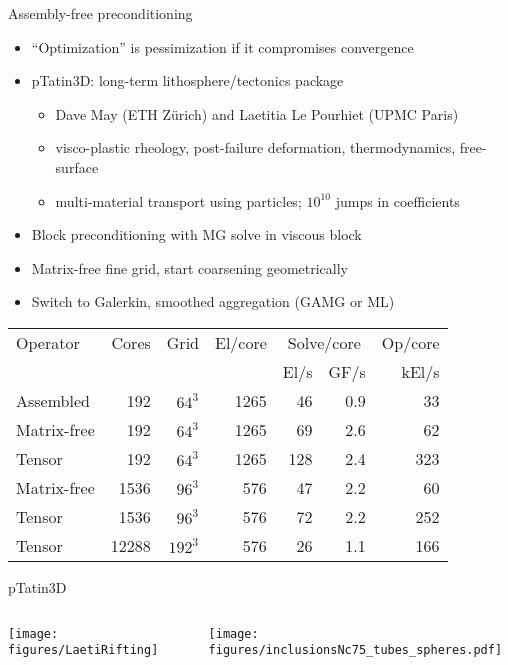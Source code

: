 \documentclass{beamer}
\begin{document}
\begin{frame}{Assembly-free preconditioning}
  \begin{itemize}
  \item ``Optimization'' is pessimization if it compromises convergence
  \item pTatin3D: long-term lithosphere/tectonics package
    \begin{itemize}
    \item Dave May (ETH Z\"urich) and Laetitia Le Pourhiet (UPMC Paris)
    \item visco-plastic rheology, post-failure deformation, thermodynamics, free-surface
    \item multi-material transport using particles; $10^{10}$ jumps in coefficients
    \end{itemize}
  \item Block preconditioning with MG solve in viscous block
  \item Matrix-free fine grid, start coarsening geometrically
  \item Switch to Galerkin, smoothed aggregation (GAMG or ML)
  \end{itemize}
  \begin{tabular}{l rrr rr r}
    \toprule
    Operator    & Cores & Grid   & El/core & \multicolumn{2}{c}{Solve/core} & Op/core           \\
    &       &        &         & El/s                    & GF/s & kEl/s \\
    \midrule
    Assembled   & 192 & $64^3$ & 1265 & 46  & 0.9 & 33         \\
    Matrix-free & 192 & $64^3$ & 1265 & 69  & 2.6 & 62         \\
    Tensor      & 192 & $64^3$ & 1265 & 128 & 2.4 & 323        \\
    
    Matrix-free & 1536 & $96^3$ & 576  & 47  & 2.2 & 60  \\
    Tensor      & 1536 & $96^3$ & 576  & 72  & 2.2 & 252 \\
    
    Tensor      & 12288 & $192^3$ & 576  & 26 & 1.1 & 166 \\
    \bottomrule
  \end{tabular}
\end{frame}

\begin{frame}{pTatin3D}
  \begin{columns}
    \begin{column}{0.5\textwidth}
      \begin{center}
        \texttt{[image: figures/LaetiRifting]}
      \end{center}
    \end{column}
    \begin{column}{0.5\textwidth}
      \begin{center}
        \texttt{[image: figures/inclusionsNc75\_tubes\_spheres.pdf]}
      \end{center}
    \end{column}
  \end{columns}
\end{frame}
\end{document}
